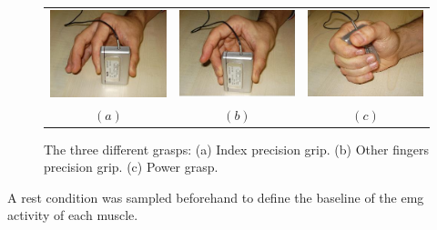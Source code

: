 \begin{figure}[!t] \centering
  \begin{tabular}{ccc}
   \includegraphics[height=0.16\textheight]{figs/grip1} &
    \includegraphics[height=0.16\textheight]{figs/grip2} &
    \includegraphics[height=0.16\textheight]{figs/grip3} \\
    $(a)$ & $(b)$ & $(c)$ \\
  \end{tabular}
  \caption{The three different grasps: (a) Index precision grip. (b) Other fingers precision grip. (c) Power grasp.}
  \label{fig:Grasps}
\end{figure}

A rest condition was sampled beforehand to define the baseline of the emg activity of each muscle.

